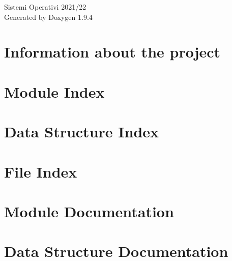 \documentclass[twoside]{book}
\newcommand{\+}{\discretionary{\mbox{\scriptsize$\hookleftarrow$}}{}{}}
\newcommand{\clearemptydoublepage}{%
    \newpage{\pagestyle{empty}\cleardoublepage}%
  }
\begin{document}
  \raggedbottom
    \hypersetup{pageanchor=false,
                bookmarksnumbered=true,
                pdfencoding=unicode
               }
  \begin{titlepage}
  \vspace*{7cm}
  \begin{center}%
  {\Large Sistemi Operativi 2021/22}\\
  \vspace*{1cm}
  {\large Generated by Doxygen 1.9.4}\\
  \end{center}
  \end{titlepage}
  \clearemptydoublepage
  \tableofcontents
  \clearemptydoublepage
  \hypersetup{pageanchor=true}
\chapter{Information about the project}
\label{index}\hypertarget{index}{}
\chapter{Module Index}

\chapter{Data Structure Index}

\chapter{File Index}

\chapter{Module Documentation}













\chapter{Data Structure Documentation}

















\end{document}
